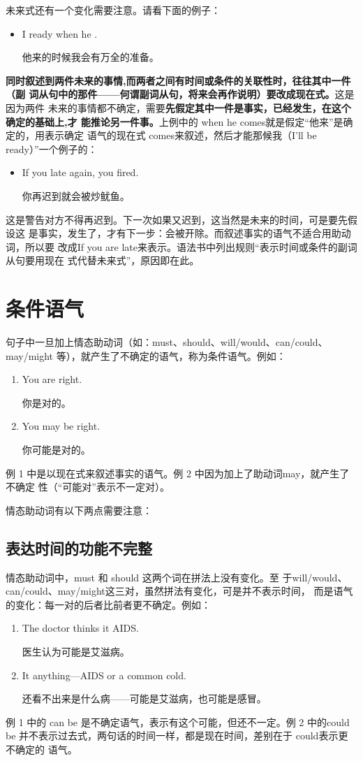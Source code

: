 未来式还有一个变化需要注意。请看下面的例子：
\begin{itemize}
\item  I ready when he .

  他来的时候我会有万全的准备。
\end{itemize}
\textbf{同时叙述到两件未来的事情,而两者之间有时间或条件的关联性时，往往其中一件（副
  词从句中的那件——何谓副词从句，将来会再作说明）要改成现在式。}这是因为两件
未来的事情都不确定，需要\textbf{先假定其中一件是事实，已经发生，在这个确定的基础上,才
  能推论另一件事。}上例中的 when he comes就是假定“他来”是确定的，用表示确定
语气的现在式 comes来叙述，然后才能那候我（I'll be ready）”一个例子的：
\begin{itemize}
\item  If you  late again, you fired.

  你再迟到就会被炒鱿鱼。
\end{itemize}
这是警告对方不得再迟到。下一次如果又迟到，这当然是未来的时间，可是要先假设这
是事实，发生了，才有下一步：会被开除。而叙述事实的语气不适合用助动词，所以要
改成If you are late来表示。语法书中列出规则“表示时间或条件的副词从句要用现在
式代替未来式”，原因即在此。

\section{条件语气}

句子中一旦加上情态助动词（如：must、should、will/would、can/could、may/might
等），就产生了不确定的语气，称为条件语气。例如：
\begin{enumerate}
\item  You are right.

  你是对的。
\item  You may be right.

  你可能是对的。
\end{enumerate}
例 1 中是以现在式来叙述事实的语气。例 2 中因为加上了助动词may，就产生了不确定
性（“可能对”表示不一定对）。

情态助动词有以下两点需要注意：

\subsection{表达时间的功能不完整}

情态助动词中，must 和 should 这两个词在拼法上没有变化。至
于will/would、can/could、may/might这三对，虽然拼法有变化，可是并不表示时间，
而是语气的变化：每一对的后者比前者更不确定。例如：
\begin{enumerate}
\item The doctor thinks it  AIDS.

  医生认为可能是艾滋病。
\item It  anything---AIDS or a common cold.

  还看不出来是什么病——可能是艾滋病，也可能是感冒。
\end{enumerate}
例 1 中的 can be 是不确定语气，表示有这个可能，但还不一定。例 2 中的could be
并不表示过去式，两句话的时间一样，都是现在时间，差别在于 could表示更不确定的
语气。


